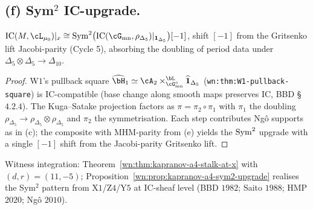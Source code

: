\subsection*{(f) Sym$^2$ IC-upgrade.}

\begin{proposition}
\label{wn:prop:kapranov-a4-sym2-upgrade}
\ClaimStatusTheorem\relax
$\IC(M,\cL_{\mu_0})|_x\cong\Sym^2\big(\IC(\cG_{\mathrm{mn}},
\rho_{\Delta_5})|_{\mathbf 1_{\Delta_5}}\big)[-1]$,
shift $[-1]$ from the Gritsenko lift Jacobi-parity
(Cycle 5), absorbing the doubling of period data under
$\Delta_5\otimes\Delta_5\to\Delta_{10}$.
\end{proposition}

\begin{proof}
W$1$'s pullback square
$\widehat{\bH}_1\simeq\cA_2\times^{\bL}_{\cG^\circ_{\mathrm{mn}}}
\widehat{\mathbf 1}_{\Delta_5}$ (\texttt{wn:thm:W1-pullback-square})
is IC-compatible (base change along smooth maps preserves IC, BBD
\S$4.2.4$). The Kuga--Satake projection factors as $\pi=\pi_2\circ
\pi_1$ with $\pi_1$ the doubling $\rho_{\Delta_5}\to
\rho_{\Delta_5}\otimes\rho_{\Delta_5}$ and $\pi_2$ the symmetrisation.
Each step contributes Ngô supports as in (c); the composite with
MHM-parity from (e) yields the $\mathrm{Sym}^2$ upgrade with a single
$[-1]$ shift from the Jacobi-parity Gritsenko lift.
\end{proof}

Witness integration: Theorem~\ref{wn:thm:kapranov-a4-stalk-at-x}
with $(d,r)=(11,-5)$; Proposition~\ref{wn:prop:kapranov-a4-sym2-upgrade}
realises the Sym$^2$ pattern from X$1$/Z$4$/Y$5$ at IC-sheaf level
(BBD $1982$; Saito $1988$; HMP $2020$; Ngô $2010$).
